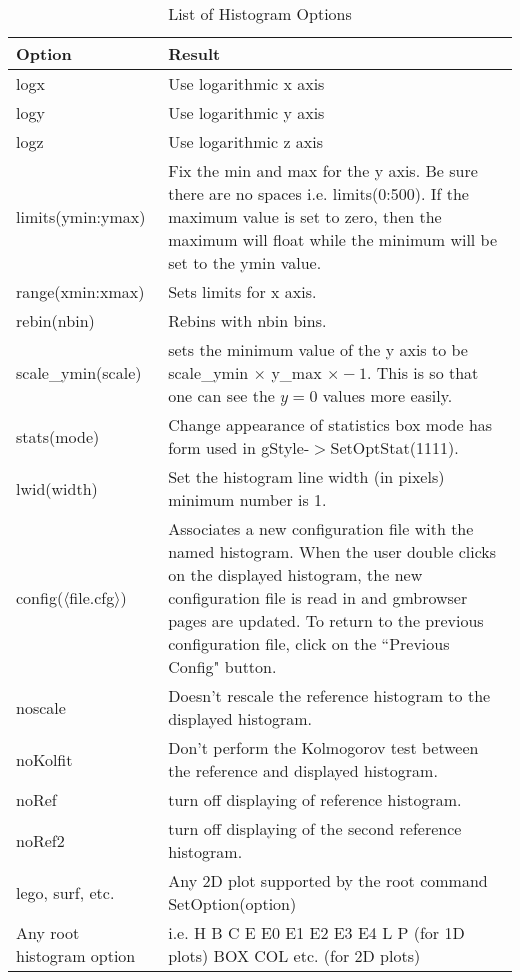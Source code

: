 \documentclass[12pt]{article}
\begin{document}
\begin{table}
\begin{tabular}{lp{3.5in}}
\hline\hline
Option & Result \\ \hline
 logx             & Use logarithmic x axis\\
 logy             & Use logarithmic y axis\\
 logz             & Use logarithmic z axis\\
 limits(ymin:ymax) & Fix the min and max for the y axis.
                         Be sure there are no spaces 
                         i.e. limits(0:500).
                         If the maximum value is set to zero, then
                         the maximum will float while the minimum
                         will be set to the ymin value.\\
 range(xmin:xmax)      & Sets limits for x axis.\\
 rebin(nbin)           & Rebins with nbin bins.\\
 scale\_ymin(scale)    & sets the minimum value of the y axis to be
                         scale\_ymin $\times$ y\_max $\times -1$. This
                         is so that one can see the $y=0$ values more easily.\\
 stats(mode)           & Change appearance of statistics box
                         mode has form used in
                         gStyle-$>$SetOptStat(1111).\\
 lwid(width)           & Set the histogram line width (in pixels)
                         minimum number is 1.\\
 config($\langle$file.cfg$\rangle$)  & Associates a new configuration file with
                         the named histogram. When the user double
                         clicks on the displayed histogram, the new
                         configuration file is read in and gmbrowser
                         pages are updated. To return to the previous
                         configuration file, click on the ``Previous
                         Config" button.\\
 noscale               & Doesn't rescale the reference histogram to the
                         displayed histogram.\\
 noKolfit              & Don't perform the Kolmogorov test between the
                         reference and displayed histogram.\\
 noRef                 & turn off displaying of reference histogram.\\
 noRef2                 & turn off displaying of the second reference 
                          histogram.\\
 lego, surf, etc.      & Any 2D plot supported by the root command SetOption(option) \\
 Any root histogram option & i.e. H B C E E0 E1 E2 E3 E4 L P (for 1D plots)
                             BOX COL etc. (for 2D plots)\\
\hline
\end{tabular}
\caption{List of Histogram Options}
\label{tab:options}
\end{table}
\end{document}
